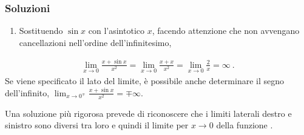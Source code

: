 \documentclass[letterpaper,10pt,italian]{jupyterBook}
\begin{document}
\subsubsection*{Soluzioni}
\begin{enumerate}
%
\setcounter{enumi}{10}
\item {} 
\sphinxAtStartPar
Sostituendo \(\sin x\) con l’asintotico \(x\), facendo attenzione che non avvengano cancellazioni nell’ordine dell’infinitesimo,

\end{enumerate}
\begin{equation*}
\begin{split}\lim_{x \to 0} \frac{x + \sin x}{x^2} = \lim_{x \to 0} \frac{x + x}{x^2} = \lim_{x \to 0} \frac{2}{x} = \infty \ .\end{split}
\end{equation*}
\sphinxAtStartPar
Se viene specificato il lato del limite, è possibile anche determinare il segno dell’infinito, \(\lim_{x \to 0^{\mp}} \frac{x + \sin x}{x^2} = \mp \infty\).

\sphinxAtStartPar
{} Una soluzione più rigorosa prevede di riconoscere che i limiti laterali destro e sinistro sono diversi tra loro e quindi il limite per \(x \rightarrow 0\) della funzione .
 \label{exercise:ch/infinitesimal_calculus/analysis-problems-exercise-5}
\end{document}
